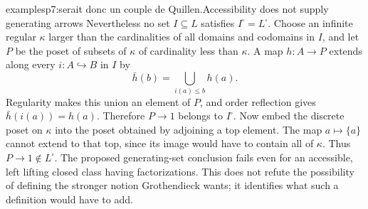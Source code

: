 \begin{dcomment}{examples}{p7:serait donc un couple de Quillen.}{Accessibility does not supply generating arrows}
Nevertheless no set $I\subseteq L$ satisfies $I^{\square}=L^{\square}$. Choose an infinite regular $\kappa$ larger than the cardinalities of all domains and codomains in $I$, and let $P$ be the poset of subsets of $\kappa$ of cardinality less than $\kappa$. A map $h:A\to P$ extends along every $i:A\hookrightarrow B$ in $I$ by
\[
 \bar h(b)=\bigcup_{i(a)\leq b}h(a).
\]
Regularity makes this union an element of $P$, and order reflection gives $\bar h(i(a))=h(a)$. Therefore $P\to1$ belongs to $I^{\square}$. Now embed the discrete poset on $\kappa$ into the poset obtained by adjoining a top element. The map $a\mapsto\{a\}$ cannot extend to that top, since its image would have to contain all of $\kappa$. Thus $P\to1\notin L^{\square}$. The proposed generating-set conclusion fails even for an accessible, left lifting closed class having factorizations. This does not refute the possibility of defining the stronger notion Grothendieck wants; it identifies what such a definition would have to add.
\end{dcomment}

